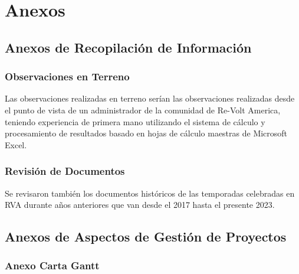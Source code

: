 \chapter{Anexos}

\section{Anexos de Recopilación de Información}

\subsection{Observaciones en Terreno}
Las observaciones realizadas en terreno serían las observaciones realizadas desde el punto de vista de un administrador de la comunidad de Re-Volt America, teniendo experiencia de primera mano utilizando el sistema de cálculo y procesamiento de resultados basado en hojas de cálculo maestras de Microsoft Excel.

\subsection{Revisión de Documentos}
Se revisaron también los documentos históricos de las temporadas celebradas en RVA durante años anteriores que van desde el 2017 hasta el presente 2023. 

\section{Anexos de Aspectos de Gestión de Proyectos}

\subsection{Anexo Carta Gantt}

